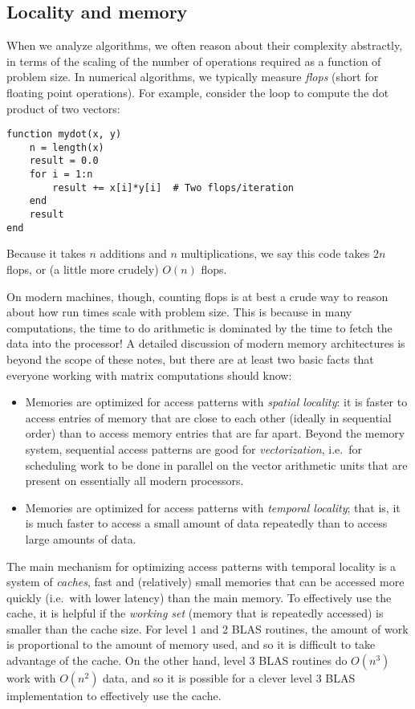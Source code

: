 \documentclass[12pt, leqno]{article} %
\begin{document}
\subsection{Locality and memory}

When we analyze algorithms, we often reason about their complexity
abstractly, in terms of the scaling of the number of operations required
as a function of problem size.  In numerical algorithms, we typically
measure {\em flops} (short for floating point operations).  For example,
consider the loop to compute the dot product of two vectors:
\begin{lstlisting}
function mydot(x, y)
    n = length(x)
    result = 0.0
    for i = 1:n
        result += x[i]*y[i]  # Two flops/iteration
    end
    result
end
\end{lstlisting}
Because it takes $n$ additions and $n$ multiplications, we say this code
takes $2n$ flops, or (a little more crudely) $O(n)$ flops.

On modern machines, though, counting flops is at best a crude way
to reason about how run times scale with problem size.  This is because
in many computations, the time to do arithmetic is dominated by the time
to fetch the data into the processor!  A detailed discussion of modern
memory architectures is beyond the scope of these notes, but there are
at least two basic facts that everyone working with matrix computations
should know:
\begin{itemize}
\item
  Memories are optimized for access patterns with {\em spatial locality}:
  it is faster to access entries of memory that are close to each
  other (ideally in sequential order) than to access memory entries that
  are far apart.  Beyond the memory system, sequential access patterns
  are good for {\em vectorization}, i.e.~for scheduling work to be done
  in parallel on the vector arithmetic units
  that are present on essentially all modern processors.
\item
  Memories are optimized for access patterns with {\em temporal locality};
  that is, it is much faster to access a small amount of data repeatedly
  than to access large amounts of data.
\end{itemize}

The main mechanism for optimizing access patterns with temporal locality
is a system of {\em caches}, fast and (relatively) small memories that can
be accessed more quickly (i.e.~with lower latency) than the main memory.
To effectively use the cache, it is helpful if the {\em working set}
(memory that is repeatedly accessed) is smaller than the cache size.
For level 1 and 2 BLAS routines, the amount of work is proportional to
the amount of memory used, and so it is difficult to take advantage of
the cache.  On the other hand, level 3 BLAS routines do $O(n^3)$ work
with $O(n^2)$ data, and so it is possible for a clever level 3 BLAS
implementation to effectively use the cache.
\end{document}
